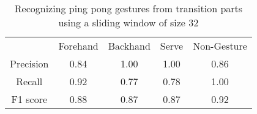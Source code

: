 \begin{table}[h]
\begin{tabular}{ccccc}
                                  & \cellcolor[HTML]{C0C0C0}Forehand & \cellcolor[HTML]{C0C0C0}Backhand & \cellcolor[HTML]{C0C0C0}Serve & \cellcolor[HTML]{C0C0C0}Non-Gesture \\
\cellcolor[HTML]{C0C0C0}Precision & 0.84                             & 1.00                             & 1.00                          & 0.86                                \\
\cellcolor[HTML]{C0C0C0}Recall    & 0.92                             & 0.77                             & 0.78                          & 1.00                                \\
\cellcolor[HTML]{C0C0C0}F1 score  & 0.88                             & 0.87                             & 0.87                          & 0.92                               
\end{tabular}
\caption{Recognizing ping pong gestures from transition parts using a sliding window of size 32}
\label{table-scoreThresh}
\end{table}